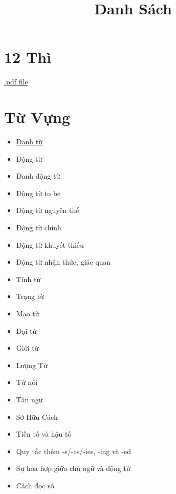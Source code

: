 \title{\Huge \textbf{Danh Sách}}
\maketitle
\tableofcontents

\chapter{12 Thì}
\href{https://github.com/theslime016/english-project/blob/main/english-project-release-files/12Tenses.pdf}
{.pdf file}
\chapter{Từ Vựng}
\begin{multicols*}{2}
\begin{itemize}
    \item \href{https://github.com/theslime016/english-project/blob/main/english-project-release-files/Noun.pdf}{Danh từ}
	\item Động từ
	\item Danh động từ
	\item Động từ to be
	\item Động từ nguyên thể
	\item Động từ chính
	\item Động từ khuyết thiếu
	\item Động từ nhận thức, giác quan
	\item Tính từ
	\item Trạng từ
	\item Mạo từ
	\item Đại từ
	\item Giới từ
	\item Lượng Từ
	\item Từ nối
	\item Tân ngữ
	\item Sở Hữu Cách
	\item Tiền tố và hậu tố
	\item Quy tắc thêm -s/-es/-ies, -ing và -ed
	\item Sự hòa hợp giữa chủ ngữ và động từ
	\item Cách đọc số
\end{itemize}
\end{multicols*}

